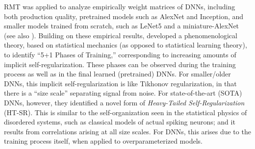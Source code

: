 \documentclass{article}
\begin{document}
RMT was applied to analyze empirically weight matrices of DNNs, including both production quality, pretrained models such as AlexNet and Inception, and smaller models trained from scratch, such as LeNet5 and a miniature-AlexNet~\cite{MM18_TR} (see also \cite{MM17_TR, MM18_TR, MM19_HTSR_ICML, MM20_SDM, MM19_KDD}).
Building on these empirical results, 
\citet{MM18_TR} developed a phenomenological theory, based on statistical mechanics (as opposed to statistical learning theory), to identify ``5+1 Phases of Training,'' 
corresponding to increasing amounts of implicit self-regularization.
These phases can be observed during the training process as well as in the final learned (pretrained) DNNs.
For smaller/older DNNs, this implicit self-regularization is like Tikhonov regularization, in that there is a ``size scale'' separating signal from noise.
For state-of-the-art (SOTA) DNNs, however, they identified a novel form of \emph{Heavy-Tailed Self-Regularization} (HT-SR).
This is similar to the self-organization seen in the statistical physics of disordered systems, such as classical models of actual spiking neurons; and 
it results from correlations arising at all size scales.
For DNNs, this arises due to the training process itself, when applied to overparameterized models.
\end{document}
